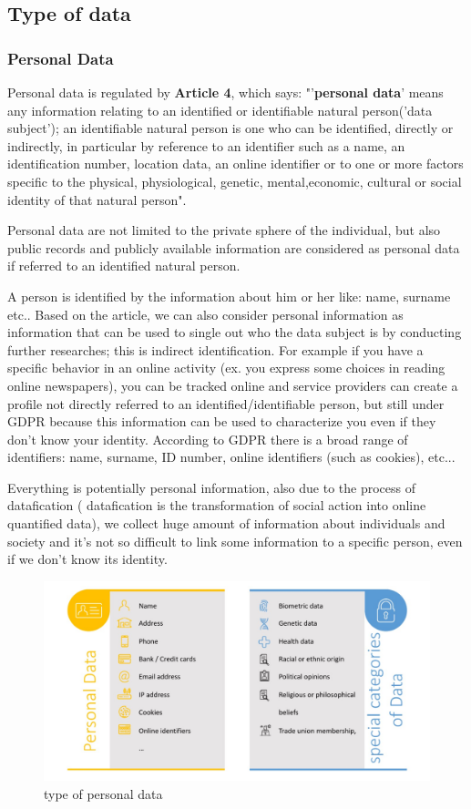 \subsection{Type of data}
\subsubsection{Personal Data}
Personal data is regulated by \textbf{Article 4}, which says: "'\textbf{personal data}' means any information relating to an identified or identifiable natural person('data subject'); an identifiable natural person is one who can be identified, directly or indirectly, in particular by reference to an identifier such as a name, an identification number, location data, an online identifier or to one or more factors specific to the physical, physiological, genetic, mental,economic, cultural or social identity of that natural person".

Personal data are not limited to the private sphere of the individual, but also public records and publicly available information are considered as personal data if referred to an identified natural person.

A person is identified by the information about him or her like: name, surname etc.. Based on the article, we can also consider personal information as information that can be used to single out who the data subject is by conducting further researches; this is indirect identification. For example if you have a specific behavior in an online activity (ex. you express some choices in reading online newspapers), you can be tracked online and service providers can create a profile not directly referred to an identified/identifiable person, but still under GDPR because this information can be used to characterize you even if they don’t know your identity. According to GDPR there is a broad range of identifiers: name, surname, ID number, online identifiers (such as cookies), etc...

Everything is potentially personal information, also due to the process of datafication ( datafication is the transformation of social action into online quantified data), we collect huge amount of information about individuals and society and it’s not so difficult to link some information to a specific person, even if we don’t know its identity.
\begin{figure}[h]
    \centering
    \includegraphics[width=12cm]{Images/personal data.jpg}
    \caption{type of personal data}
\end{figure}

